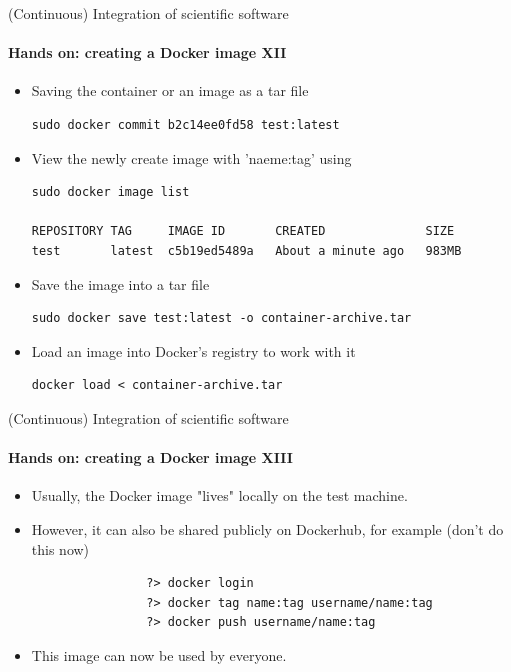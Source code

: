 \begin{frame}[fragile]{(Continuous) Integration of scientific software} 
    \framesubtitle{Hands on: creating a Docker image XII} 
    \vfill

    \begin{itemize}
        \item Saving the container or an image as a tar file 

    \begin{verbatim}
sudo docker commit b2c14ee0fd58 test:latest
    \end{verbatim}

        \item View the newly create image with 'naeme:tag' using 

    \begin{verbatim}
sudo docker image list 

REPOSITORY TAG     IMAGE ID       CREATED              SIZE
test       latest  c5b19ed5489a   About a minute ago   983MB
    \end{verbatim}

    \item Save the image into a tar file 

    \begin{verbatim}
sudo docker save test:latest -o container-archive.tar
    \end{verbatim}

    \item Load an image into Docker's registry to work with it 

    \begin{verbatim}
docker load < container-archive.tar
    \end{verbatim}

\end{itemize}

\end{frame}


\begin{frame}[fragile]{(Continuous) Integration of scientific software} 
    \framesubtitle{Hands on: creating a Docker image XIII} 
    \vfill

    \begin{itemize}
        \item Usually, the Docker image "lives" locally on the test machine. 
        \item However, it can also be shared publicly on Dockerhub, for example (don't do this now)

            \begin{verbatim}
                ?> docker login 
                ?> docker tag name:tag username/name:tag
                ?> docker push username/name:tag
            \end{verbatim}
        \item This image can now be used by everyone.

    \end{itemize}

\end{frame}

